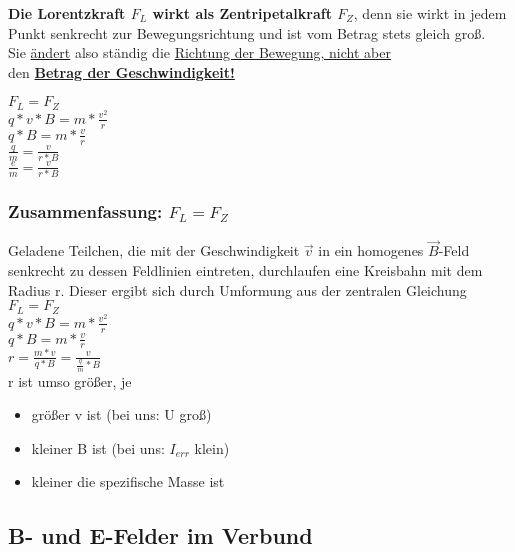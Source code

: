 \documentclass[12pt]{scrartcl}
\begin{document}
\begin{flushleft}
		\textbf{Die Lorentzkraft $F_L$ wirkt als Zentripetalkraft $F_Z$}, denn sie wirkt in jedem Punkt senkrecht zur Bewegungsrichtung und ist vom Betrag stets gleich groß. \\
		Sie \underline{ändert} also ständig die \underline{Richtung der Bewegung, nicht aber} \\ den \underline{\textbf{Betrag der Geschwindigkeit!}}
		
		\vspace{3mm} 
		$ F_L = F_Z$
		\vspace{1mm} \\
		$ q \ast v \ast B = m \ast \frac{v^2}{r} $
		\vspace{1mm} \\
		$ q \ast B = m \ast \frac{v}{r} $
		\vspace{2mm} \\
		$ \frac{q}{m} = \frac{v}{r \ast B} $
		\vspace{2mm} \\
		$ \frac{e}{m} = \frac{v}{r \ast B} $
		
			\subsubsection{Zusammenfassung: $F_L = F_Z$}
			Geladene Teilchen, die mit der Geschwindigkeit $\vec{v}$ in ein homogenes $\vec{B}$-Feld senkrecht zu dessen Feldlinien eintreten, durchlaufen eine Kreisbahn mit dem Radius r. Dieser ergibt sich durch Umformung aus der zentralen Gleichung 
			$F_L = F_Z$
			\vspace{1mm} \\
			$ q \ast v \ast B = m \ast \frac{v^2}{r} $
			\vspace{1mm} \\
			$ q \ast B = m \ast \frac{v}{r} $
			\vspace{1mm} \\
			$ r = \frac{m \ast v}{q \ast B} = \frac{v}{\frac{q}{m} \ast B} $
			\vspace{5mm} \\
			r ist umso größer, je
			\begin{itemize}
				\item größer v ist (bei uns: U groß)
				\item kleiner B ist (bei uns: $I_{err}$ klein)
				\item kleiner die spezifische Masse ist
			\end{itemize}
		
		\subsection{B- und E-Felder im Verbund}

\end{flushleft}
\end{document}
